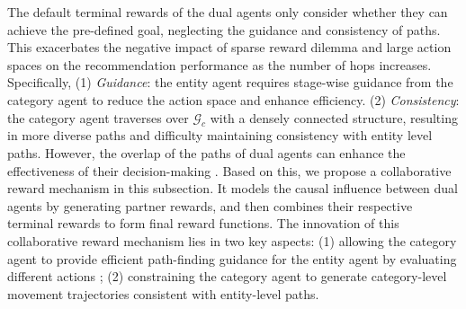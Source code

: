 \documentclass[conference]{IEEEtran}
\begin{document}
The default terminal rewards of the dual agents only consider whether they can achieve the pre-defined goal, neglecting the guidance and consistency of paths. This exacerbates the negative impact of sparse reward dilemma  and large action spaces on the recommendation performance as the number of hops increases. Specifically, (1) \emph{Guidance}: the entity agent requires stage-wise guidance from the category agent to reduce the action space and enhance efficiency. (2) \emph{Consistency}: the category agent traverses over  $\mathcal{G}_c$ with a densely connected structure, resulting in more diverse paths and difficulty maintaining consistency with entity level paths. However, the overlap of the paths of dual agents can enhance the effectiveness of their decision-making \cite{path1zx}. Based on this, we propose a collaborative reward mechanism in this subsection. It models the causal influence between dual agents by generating partner rewards, and then combines their respective terminal rewards to form final reward functions. The innovation of this collaborative reward mechanism lies in two key aspects: (1) allowing the category agent to provide efficient path-finding guidance for the entity agent by evaluating different actions \cite{EX6}; (2) constraining  the category agent to generate category-level movement trajectories consistent with entity-level paths.
\end{document}
